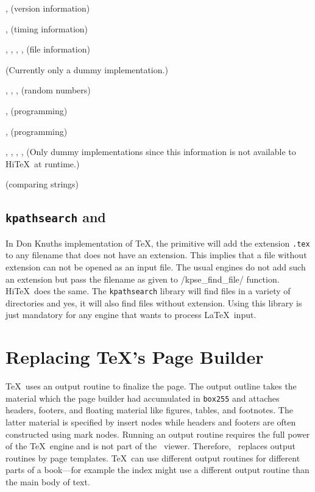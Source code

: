 \itemize
\item{},  (version information)
\item{},  (timing information)
\item{}, , ,
     ,  (file information)
\item{} (Currently only a dummy implementation.)
\item{}, ,
     ,  (random numbers)
\item{},  (programming)
\item{},   (programming)
\item{}, , , ,
      (Only dummy implementations since this information
      is not available to Hi\TeX\ at runtime.)
\item{} (comparing strings)
\enditemize 


\subsection{{\tt kpathsearch} and }
In Don Knuths implementation of \TeX, the  primitive
will add the extension {\tt .tex} to any filename that does not have an
extension. This implies that a file without extension can not be opened
as an input file. The usual engines do not add such an extension but
pass the filename as given to \verbatim/kpse_find_file/ function. 
Hi\TeX\ does the same. The {\tt kpathsearch} library will find files
in a variety of directories and yes, it will also find files without
extension. Using this library is just mandatory for any engine that
wants to process \LaTeX\ input.


\section{Replacing \TeX's Page Builder}\label{build}

\TeX\ uses an output routine to finalize the page. 
The output outline takes the material which the page builder had accumulated in {\tt box255}
and attaches headers, footers, and floating material
like figures, tables, and footnotes. The latter material is specified by insert nodes
while headers and footers are often constructed using mark nodes.
Running an output routine requires the full power of the \TeX\ engine and is not 
part of the \HINT\ viewer. Therefore, \HINT\ replaces output routines by page templates.
\TeX\ can use different output routines for different parts of a book---for example
the index might use a different output routine than the main body of text.

